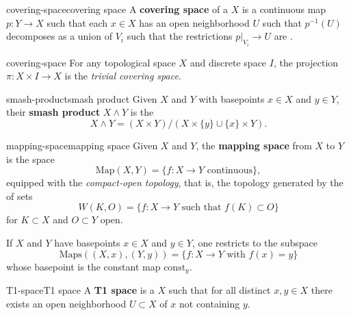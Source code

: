 \begin{topic}{covering-space}{covering space}
    A \textbf{covering space} of a  $X$ is a continuous map $p : Y \to X$ such that each $x \in X$ has an open neighborhood $U$ such that $p^{-1}(U)$ decomposes as a union of $V_i$ such that the restrictions $p|_{V_i} \to U$ are .
\end{topic}

\begin{example}{covering-space}
    For any topological space $X$ and discrete space $I$, the projection $\pi : X \times I \to X$ is the \textit{trivial covering space}.
\end{example}

\begin{topic}{smash-product}{smash product}
    Given  $X$ and $Y$ with basepoints $x \in X$ and $y \in Y$, their \textbf{smash product} $X \wedge Y$ is the 
    \[ X \wedge Y = (X \times Y) / (X \times \{ y \} \cup \{ x \} \times Y) . \]
\end{topic}

\begin{topic}{mapping-space}{mapping space}
    Given  $X$ and $Y$, the \textbf{mapping space} from $X$ to $Y$ is the space
    \[ \text{Map}(X, Y) = \{ f : X \to Y \text{ continuous} \} , \]
    equipped with the \textit{compact-open topology}, that is, the topology generated by the  of sets
    \[ W(K, O) = \{ f : X \to Y \text{ such that } f(K) \subset O \} \]
    for $K \subset X$  and $O \subset Y$ open.
    
    If $X$ and $Y$ have basepoints $x \in X$ and $y \in Y$, one restricts to the subspace
    \[ \text{Maps}((X, x), (Y, y)) = \{ f : X \to Y \text{ with } f(x) = y \} \]
    whose basepoint is the constant map $\text{const}_y$.
\end{topic}

\begin{topic}{T1-space}{T1 space}
    A \textbf{T1 space} is a  $X$ such that for all distinct $x, y \in X$ there exists an open neighborhood $U \subset X$ of $x$ not containing $y$.
\end{topic}


